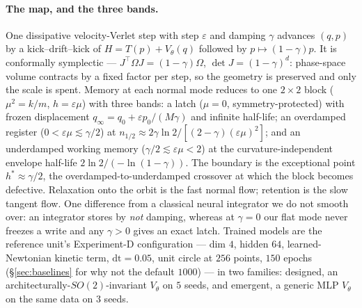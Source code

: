 \documentclass{article}
\begin{document}
\paragraph{The map, and the three bands.} One dissipative velocity-Verlet step with step $\varepsilon$ and damping $\gamma$ advances $(q,p)$ by a kick--drift--kick of $H=T(p)+V_\theta(q)$ followed by $p\mapsto(1-\gamma)p$. It is conformally symplectic --- $J^\top\Omega J=(1-\gamma)\Omega$, $\det J=(1-\gamma)^d$: phase-space volume contracts by a fixed factor per step, so the geometry is preserved and only the scale is spent. Memory at each normal mode reduces to one $2\times2$ block ($\mu^2=k/m$, $h=\varepsilon\mu$) with three bands: a latch ($\mu=0$, symmetry-protected) with frozen displacement $q_\infty=q_0+\varepsilon p_0/(M\gamma)$ and infinite half-life; an overdamped register ($0<\varepsilon\mu\lesssim\gamma/2$) at $n_{1/2}\approx2\gamma\ln2/[(2-\gamma)(\varepsilon\mu)^2]$; and an underdamped working memory ($\gamma/2\lesssim\varepsilon\mu<2$) at the curvature-independent envelope half-life $2\ln2/(-\ln(1-\gamma))$. The boundary is the exceptional point $h^*\approx\gamma/2$, the overdamped-to-underdamped crossover at which the block becomes defective. Relaxation onto the orbit is the fast normal flow; retention is the slow tangent flow. One difference from a classical neural integrator we do not smooth over: an integrator stores by \emph{not} damping, whereas at $\gamma=0$ our flat mode never freezes a write and any $\gamma>0$ gives an exact latch. Trained models are the reference unit's Experiment-D configuration --- dim $4$, hidden $64$, learned-Newtonian kinetic term, $\mathrm{dt}=0.05$, unit circle at $256$ points, $150$ epochs (\S\ref{sec:baselines} for why not the default $1000$) --- in two families: designed, an architecturally-$SO(2)$-invariant $V_\theta$ on $5$ seeds, and emergent, a generic MLP $V_\theta$ on the same data on $3$ seeds.
\end{document}
